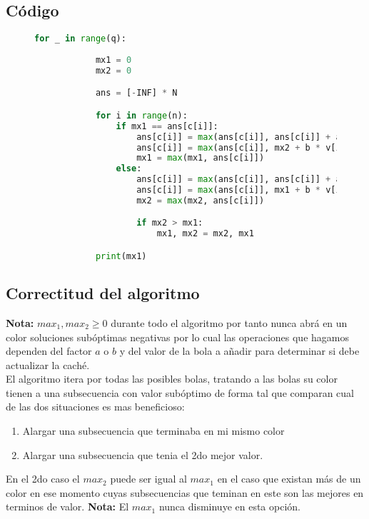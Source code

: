 \documentclass{article}
\begin{document}
\subsection{Código}

\begin{figure}[H]
    \centering
    \begin{lstlisting}[language=Python]
        for _ in range(q):
    
            mx1 = 0
            mx2 = 0

            ans = [-INF] * N 

            for i in range(n):
                if mx1 == ans[c[i]]:
                    ans[c[i]] = max(ans[c[i]], ans[c[i]] + a * v[i])
                    ans[c[i]] = max(ans[c[i]], mx2 + b * v[i])
                    mx1 = max(mx1, ans[c[i]])
                else:
                    ans[c[i]] = max(ans[c[i]], ans[c[i]] + a * v[i])
                    ans[c[i]] = max(ans[c[i]], mx1 + b * v[i])
                    mx2 = max(mx2, ans[c[i]])

                    if mx2 > mx1:
                        mx1, mx2 = mx2, mx1

            print(mx1)
    \end{lstlisting}
\end{figure}

\subsection{Correctitud del algoritmo}
\textbf{Nota:}
$max_1, max_2 \geq 0$ durante todo el algoritmo por tanto nunca abrá en un color soluciones subóptimas negativas 
por lo cual las operaciones que hagamos dependen del factor $a$ o $b$ y del valor de la bola a añadir para determinar 
si debe actualizar la caché.
\\
El algoritmo itera por todas las posibles bolas, tratando a las bolas su color tienen a una subsecuencia con valor 
subóptimo de forma tal que comparan cual de las dos situaciones es mas beneficioso:
\begin{enumerate}
    \item Alargar una subsecuencia que terminaba en mi mismo color
    \item Alargar una subsecuencia que tenia el 2do mejor valor.
\end{enumerate}
 En el 2do caso el $max_2 $ puede ser igual al $max_ 1$ en el caso que existan más de un color en ese momento cuyas
 subsecuencias que teminan en este son las mejores en terminos de valor.
\textbf{Nota:} El $max_1$ nunca disminuye en esta opción.
\end{document}
